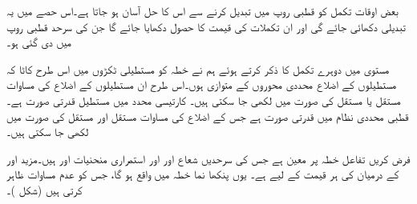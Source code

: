 بعض اوقات تکمل کو قطبی روپ میں تبدیل کرنے سے  اس کا حل آسان ہو جاتا ہے۔اس حصے میں یہ تبدیلی دکھائی جائے گی اور ان تکملات کی قیمت کا حصول دکھایا جائے گا جن کی سرحد قطبی روپ میں دی گئی ہو۔

مستوی  میں دوہرے  تکمل کا ذکر کرتے ہوئے  ہم نے خطہ  کو  مستطیلی ٹکڑوں میں اس طرح   کاٹا کہ مستطیلوں کے اضلاع محددی محوروں کے متوازی ہوں۔اس طرح   ان مستطیلوں کے اضلاع   کی مساوات مستقل   یا مستقل   کی صورت میں لکھی جا سکتی ہیں۔ کارتیسی محدد میں مستطیل قدرتی صورت ہے۔ قطبی محددی نظام میں  قدرتی صورت ہے جس کے اضلاع  کی مساوات مستقل  اور مستقل  کی صورت میں  لکھی جا سکتی ہیں۔

فرض کریں تفاعل   خطہ  پر معین ہے  جس  کی  سرحدیں  شعاع   اور  اور استمراری منحنیات  اور   ہیں۔مزید  اور  کے درمیان  کی ہر  قیمت کے لیے  ہے۔ یوں   پنکھا نما  خطہ  میں  واقع ہو گا، جس کو عدم مساوات  ظاہر کرتی ہیں (شکل )۔

